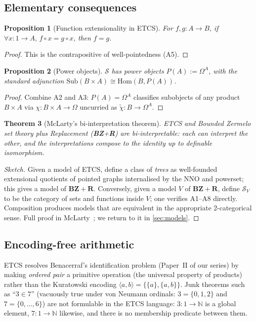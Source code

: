 \documentclass[12pt]{article}
\newtheorem{theorem}{Theorem}[section]
\newtheorem{proposition}[theorem]{Proposition}
\theoremstyle{definition}
\theoremstyle{remark}
\begin{document}
\subsection{Elementary consequences}

\begin{proposition}[Function extensionality in ETCS]
\label{prop:etcsfunext}
For $f,g: A\to B$, if $\forall x:1\to A,\, f\circ x = g\circ x$, then $f=g$.
\end{proposition}
\begin{proof}
This is the contrapositive of well-pointedness (A5).
\end{proof}

\begin{proposition}[Power objects]
\label{prop:etcspower}
$\mathcal{S}$ has power objects $P(A) := \Omega^A$, with the standard adjunction
$\mathrm{Sub}(B\times A)\cong \mathrm{Hom}(B, P(A))$.
\end{proposition}
\begin{proof}
Combine A2 and A3: $P(A) = \Omega^A$ classifies subobjects of any product
$B\times A$ via $\chi: B\times A \to \Omega$ uncurried as $\widetilde{\chi}:
B\to \Omega^A$.
\end{proof}

\begin{theorem}[McLarty's bi-interpretation theorem]
\label{thm:mclarty}
ETCS and Bounded Zermelo set theory plus Replacement (\textbf{BZ}+\textbf{R}) are
bi-interpretable: each can interpret the other, and the interpretations compose to the
identity up to definable isomorphism.
\end{theorem}
\begin{proof}[Sketch]
Given a model of ETCS, define a class of \emph{trees} as well-founded extensional
quotients of pointed graphs internalised by the NNO and powerset; this gives a model of
$\mathbf{BZ}+\mathbf{R}$. Conversely, given a model $V$ of $\mathbf{BZ}+\mathbf{R}$,
define $\mathcal{S}_V$ to be the category of sets and functions inside $V$; one verifies
A1--A8 directly. Composition produces models that are equivalent
in the appropriate 2-categorical sense. Full proof in McLarty~\cite{McLarty2004}; we
return to it in \cref{sec:models}.
\end{proof}

\subsection{Encoding-free arithmetic}

ETCS resolves Benacerraf's identification problem (Paper~II of our series) by making
\emph{ordered pair} a primitive operation (the universal property of products) rather
than the Kuratowski encoding $\langle a,b\rangle = \{\{a\},\{a,b\}\}$. Junk theorems
such as ``$3 \in 7$'' (vacuously true under von Neumann ordinals: $3 = \{0,1,2\}$ and
$7=\{0,\ldots,6\}$) are not formulable in the ETCS language: $3:1\to \mathbb{N}$ is a
global element, $7:1\to \mathbb{N}$ likewise, and there is no membership predicate
between them.
\end{document}
